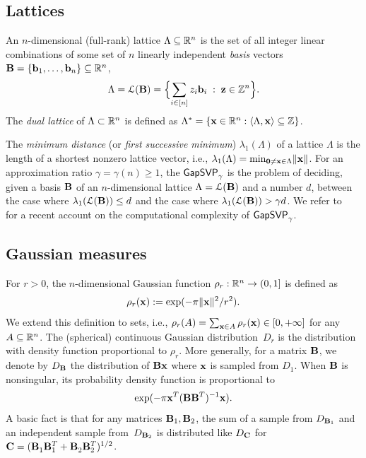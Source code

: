 \subsection{Lattices}
\label{sec:lattices}

An $n$-dimensional (full-rank) lattice $\Lambda \subseteq \R^n$ is the
set of all integer linear combinations of some set of $n$ linearly
independent \emph{basis} vectors $\matB = \set{\vecb_{1}, \ldots,
  \vecb_{n}} \subseteq \R^n$,
\[ \Lambda = \lat(\matB) = \set[\Big]{
  \sum_{i \in [n]} z_i \vecb_i\; :\; \vecz \in \mathbb{Z}^n }. \]
The \emph{dual lattice} of $\Lambda \subset \R^n$ is defined as
$\Lambda^* = \set{ \vecx \in \R^n : \inner{\Lambda,\vecx} \subseteq \Z}$.

The \emph{minimum distance} (or \emph{first successive minimum}) $\lambda_1(\Lambda)$ of a lattice
$\Lambda$ is the length of a shortest nonzero lattice vector, i.e., $\lambda_1(\Lambda) = \min_{\veczero \neq
  \vecx \in \Lambda} \length{\vecx}$.  For an approximation ratio $\gamma = \gamma(n) \ge 1$, the $\gapsvp_\gamma$ is the problem of deciding,
	given a basis $\matB$ of an $n$-dimensional lattice $\Lambda = \lat(\matB)$ and a number $d$, between the case where $\lambda_1(\lat(\matB)) \le d$ 
	and the case where $\lambda_1(\lat(\matB)) > \gamma d$.
We refer to~\cite{KhotLLL25,RegevLLL25} for a recent account 
on the computational complexity of $\gapsvp_\gamma$. 


\subsection{Gaussian measures}
\label{sec:gaussian_measures}


For $r > 0$, the $n$-dimensional Gaussian function $\rho_r : \R^{n} \to (0,1]$ is
defined as
\[ \rho_r(\vecx) := \exp(-\pi
\length{\vecx}^{2}/r^2).
\]
We extend this definition to sets, i.e., $\rho_r(A) = \sum_{\vecx \in A} \rho_r(\vecx) 
\in [0,+\infty]$ for any~$A \subseteq \R^{n}$.
The (spherical) continuous Gaussian distribution~$D_r$ is the distribution with density
function proportional to $\rho_r$. More generally, for a matrix $\matB$,
we denote by $D_\matB$ the distribution of $\matB \vecx$ where $\vecx$ is sampled
from $D_1$. When $\matB$ is nonsingular, its probability density function is
proportional to
\[
\exp(-\pi \vecx^T (\matB \matB^T)^{-1} \vecx).
\]
A basic fact is that for any matrices $\matB_1,\matB_2$, the sum of a sample from $D_{\matB_1}$ and an independent sample
from~$D_{\matB_2}$ is distributed like $D_{\matC}$ for $\matC = (\matB_1^{} \matB_1^T + \matB_2^{} \matB_2^T)^{1/2}$.

